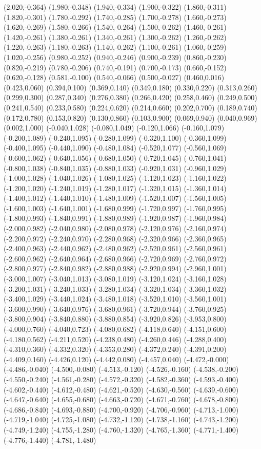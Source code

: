 (2.020,-0.364) (1.980,-0.348) (1.940,-0.334) (1.900,-0.322) (1.860,-0.311) (1.820,-0.301) (1.780,-0.292) (1.740,-0.285) (1.700,-0.278) (1.660,-0.273) (1.620,-0.269) (1.580,-0.266) (1.540,-0.264) (1.500,-0.262) (1.460,-0.261) (1.420,-0.261) (1.380,-0.261) (1.340,-0.261) (1.300,-0.262) (1.260,-0.262) (1.220,-0.263) (1.180,-0.263) (1.140,-0.262) (1.100,-0.261) (1.060,-0.259) (1.020,-0.256) (0.980,-0.252) (0.940,-0.246) (0.900,-0.239) (0.860,-0.230) (0.820,-0.219) (0.780,-0.206) (0.740,-0.191) (0.700,-0.173) (0.660,-0.152) (0.620,-0.128) (0.581,-0.100) (0.540,-0.066) (0.500,-0.027) (0.460,0.016) (0.423,0.060) (0.394,0.100) (0.369,0.140) (0.349,0.180) (0.330,0.220) (0.313,0.260) (0.299,0.300) (0.287,0.340) (0.276,0.380) (0.266,0.420) (0.258,0.460) (0.249,0.500) (0.241,0.540) (0.233,0.580) (0.224,0.620) (0.214,0.660) (0.202,0.700) (0.189,0.740) (0.172,0.780) (0.153,0.820) (0.130,0.860) (0.103,0.900) (0.069,0.940) (0.040,0.969) (0.002,1.000) (-0.040,1.028) (-0.080,1.049) (-0.120,1.066) (-0.160,1.079) (-0.200,1.089) (-0.240,1.095) (-0.280,1.099) (-0.320,1.100) (-0.360,1.099) (-0.400,1.095) (-0.440,1.090) (-0.480,1.084) (-0.520,1.077) (-0.560,1.069) (-0.600,1.062) (-0.640,1.056) (-0.680,1.050) (-0.720,1.045) (-0.760,1.041) (-0.800,1.038) (-0.840,1.035) (-0.880,1.033) (-0.920,1.031) (-0.960,1.029) (-1.000,1.028) (-1.040,1.026) (-1.080,1.025) (-1.120,1.023) (-1.160,1.022) (-1.200,1.020) (-1.240,1.019) (-1.280,1.017) (-1.320,1.015) (-1.360,1.014) (-1.400,1.012) (-1.440,1.010) (-1.480,1.009) (-1.520,1.007) (-1.560,1.005) (-1.600,1.003) (-1.640,1.001) (-1.680,0.999) (-1.720,0.997) (-1.760,0.995) (-1.800,0.993) (-1.840,0.991) (-1.880,0.989) (-1.920,0.987) (-1.960,0.984) (-2.000,0.982) (-2.040,0.980) (-2.080,0.978) (-2.120,0.976) (-2.160,0.974) (-2.200,0.972) (-2.240,0.970) (-2.280,0.968) (-2.320,0.966) (-2.360,0.965) (-2.400,0.963) (-2.440,0.962) (-2.480,0.962) (-2.520,0.961) (-2.560,0.961) (-2.600,0.962) (-2.640,0.964) (-2.680,0.966) (-2.720,0.969) (-2.760,0.972) (-2.800,0.977) (-2.840,0.982) (-2.880,0.988) (-2.920,0.994) (-2.960,1.001) (-3.000,1.007) (-3.040,1.013) (-3.080,1.019) (-3.120,1.024) (-3.160,1.028) (-3.200,1.031) (-3.240,1.033) (-3.280,1.034) (-3.320,1.034) (-3.360,1.032) (-3.400,1.029) (-3.440,1.024) (-3.480,1.018) (-3.520,1.010) (-3.560,1.001) (-3.600,0.990) (-3.640,0.976) (-3.680,0.961) (-3.720,0.944) (-3.760,0.925) (-3.800,0.904) (-3.840,0.880) (-3.880,0.854) (-3.920,0.826) (-3.953,0.800) (-4.000,0.760) (-4.040,0.723) (-4.080,0.682) (-4.118,0.640) (-4.151,0.600) (-4.180,0.562) (-4.211,0.520) (-4.238,0.480) (-4.260,0.446) (-4.288,0.400) (-4.310,0.360) (-4.332,0.320) (-4.353,0.280) (-4.372,0.240) (-4.391,0.200) (-4.409,0.160) (-4.426,0.120) (-4.442,0.080) (-4.457,0.040) (-4.472,-0.000) (-4.486,-0.040) (-4.500,-0.080) (-4.513,-0.120) (-4.526,-0.160) (-4.538,-0.200) (-4.550,-0.240) (-4.561,-0.280) (-4.572,-0.320) (-4.582,-0.360) (-4.593,-0.400) (-4.602,-0.440) (-4.612,-0.480) (-4.621,-0.520) (-4.630,-0.560) (-4.639,-0.600) (-4.647,-0.640) (-4.655,-0.680) (-4.663,-0.720) (-4.671,-0.760) (-4.678,-0.800) (-4.686,-0.840) (-4.693,-0.880) (-4.700,-0.920) (-4.706,-0.960) (-4.713,-1.000) (-4.719,-1.040) (-4.725,-1.080) (-4.732,-1.120) (-4.738,-1.160) (-4.743,-1.200) (-4.749,-1.240) (-4.755,-1.280) (-4.760,-1.320) (-4.765,-1.360) (-4.771,-1.400) (-4.776,-1.440) (-4.781,-1.480) 